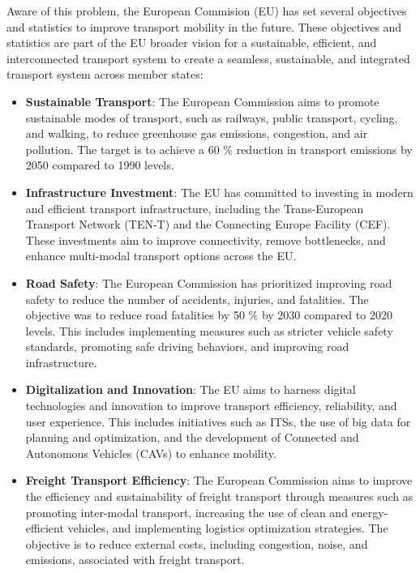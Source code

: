 Aware of this problem, the European Commision (EU) has set several objectives and statistics to improve transport mobility in the future. These objectives and statistics are part of the EU broader vision for a sustainable, efficient, and interconnected transport system to create a seamless, sustainable, and integrated transport system across member states:

\begin{itemize}
	
	\item \textbf{Sustainable Transport}: The European Commission aims to promote sustainable modes of transport, such as railways, public transport, cycling, and walking, to reduce greenhouse gas emissions, congestion, and air pollution. The target is to achieve a 60 \% reduction in transport emissions by 2050 compared to 1990 levels.
	
	\item \textbf{Infrastructure Investment}: The EU has committed to investing in modern and efficient transport infrastructure, including the Trans-European Transport Network (TEN-T) and the Connecting Europe Facility (CEF). These investments aim to improve connectivity, remove bottlenecks, and enhance multi-modal transport options across the EU.
	
	\item \textbf{Road Safety}: The European Commission has prioritized improving road safety to reduce the number of accidents, injuries, and fatalities. The objective was to reduce road fatalities by 50 \% by 2030 compared to 2020 levels. This includes implementing measures such as stricter vehicle safety standards, promoting safe driving behaviors, and improving road infrastructure.
	
	\item \textbf{Digitalization and Innovation}: The EU aims to harness digital technologies and innovation to improve transport efficiency, reliability, and user experience. This includes initiatives such as \acp{ITS}, the use of big data for planning and optimization, and the development of Connected and Autonomous Vehicles (CAVs) to enhance mobility.
	
	\item \textbf{Freight Transport Efficiency}: The European Commission aims to improve the efficiency and sustainability of freight transport through measures such as promoting inter-modal transport, increasing the use of clean and energy-efficient vehicles, and implementing logistics optimization strategies. The objective is to reduce external costs, including congestion, noise, and emissions, associated with freight transport.
	
\end{itemize}
 
